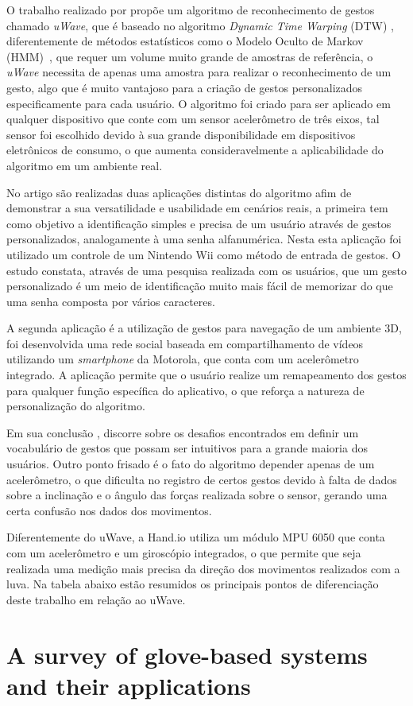 O trabalho realizado por \cite{uwave:2009} propõe um algoritmo de reconhecimento de gestos chamado \textit{uWave}, que é baseado no algoritmo \textit{Dynamic Time Warping} (DTW) , diferentemente de métodos estatísticos como o Modelo Oculto de Markov (HMM)~\cite{hmm:1989}, que requer um volume muito grande de amostras de referência, o \textit{uWave} necessita de apenas uma amostra para realizar o reconhecimento de um gesto, algo que é muito vantajoso para a criação de gestos personalizados especificamente para cada usuário. O algoritmo foi criado para ser aplicado em qualquer dispositivo que conte com um sensor acelerômetro de três eixos, tal sensor foi escolhido devido à sua grande disponibilidade em dispositivos eletrônicos de consumo, o que aumenta consideravelmente a aplicabilidade do algoritmo em um ambiente real.

No artigo são realizadas duas aplicações distintas do algoritmo afim de demonstrar a sua versatilidade e usabilidade em cenários reais, a primeira tem como objetivo a identificação simples e precisa de um usuário através de gestos personalizados, analogamente à uma senha alfanumérica. Nesta esta aplicação foi utilizado um controle de um Nintendo Wii  como método de entrada de gestos. O estudo constata, através de uma pesquisa realizada com os usuários, que um gesto personalizado é um meio de identificação muito mais fácil de memorizar do que uma senha composta por vários caracteres. 

A segunda aplicação é a utilização de gestos para navegação de um ambiente 3D, foi desenvolvida uma rede social baseada em compartilhamento de vídeos utilizando um \textit{smartphone} da Motorola, que conta com um acelerômetro integrado. A aplicação permite que o usuário realize um remapeamento dos gestos para qualquer função específica do aplicativo, o que reforça a natureza de personalização do algoritmo.

Em sua conclusão \cite{uwave:2009}, discorre sobre os desafios encontrados em definir um vocabulário de gestos que possam ser intuitivos para a grande maioria dos usuários. Outro ponto frisado é o fato do algoritmo depender apenas de um acelerômetro, o que dificulta no registro de certos gestos devido à falta de dados sobre a inclinação e o ângulo das forças realizada sobre o sensor, gerando uma certa confusão nos dados dos movimentos.

Diferentemente do uWave, a Hand.io utiliza um módulo MPU 6050 que conta com um acelerômetro e um giroscópio integrados, o que permite que seja realizada uma medição mais precisa da direção dos movimentos realizados com a luva. Na tabela abaixo estão resumidos os principais pontos de diferenciação deste trabalho em relação ao uWave.



\section{A survey of glove-based systems and their applications}

\cite{survey:2008}





